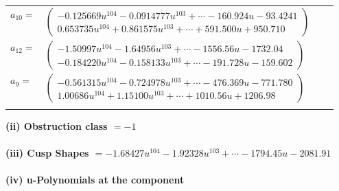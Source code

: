 \documentclass[1p]{elsarticle_modified}
\theoremstyle{definition}
\begin{document}
\begin{tabular}{m{7pt} m{180pt} m{7pt} m{180pt} }
\flushright $a_{10}=$&$\begin{pmatrix}-0.125669 u^{104}-0.0914777 u^{103}+\cdots-160.924 u-93.4241\\0.653735 u^{104}+0.861575 u^{103}+\cdots+591.500 u+950.710\end{pmatrix}$ \\
\flushright $a_{12}=$&$\begin{pmatrix}-1.50997 u^{104}-1.64956 u^{103}+\cdots-1556.56 u-1732.04\\-0.184220 u^{104}-0.158133 u^{103}+\cdots-191.728 u-159.602\end{pmatrix}$ \\
\flushright $a_{9}=$&$\begin{pmatrix}-0.561315 u^{104}-0.724978 u^{103}+\cdots-476.369 u-771.780\\1.00686 u^{104}+1.15100 u^{103}+\cdots+1010.56 u+1206.98\end{pmatrix}$\\&\end{tabular}
\flushleft \textbf{(ii) Obstruction class $= -1$}\\~\\
\flushleft \textbf{(iii) Cusp Shapes $= -1.68427 u^{104}-1.92328 u^{103}+\cdots-1794.45 u-2081.91$}\\~\\
\newpage\renewcommand{\arraystretch}{1}
\flushleft \textbf{(iv) u-Polynomials at the component}\newline \\
\end{document}
